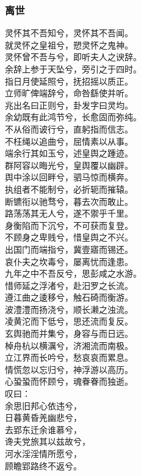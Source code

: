 \documentclass[]{article}
\begin{document}
\hypertarget{header-n326}{%
\subsubsection{离世}\label{header-n326}}

灵怀其不吾知兮，灵怀其不吾闻。\\
就灵怀之皇祖兮，愬灵怀之鬼神。\\
灵怀曾不吾与兮，即听夫人之谀辞。\\
余辞上参于天坠兮，旁引之于四时。\\
指日月使延照兮，抚招摇以质正。\\
立师旷俾端辞兮，命咎繇使并听。\\
兆出名曰正则兮，卦发字曰灵均。\\
余幼既有此鸿节兮，长愈固而弥纯。\\
不从俗而诐行兮，直躬指而信志。\\
不枉绳以追曲兮，屈情素以从事。\\
端余行其如玉兮，述皇舆之踵迹。\\
群阿容以晦光兮，皇舆覆以幽辟。\\
舆中涂以回畔兮，驷马惊而横奔。\\
执组者不能制兮，必折轭而摧辕。\\
断镳衔以驰骛兮，暮去次而敢止。\\
路荡荡其无人兮，遂不禦乎千里。\\
身衡陷而下沉兮，不可获而复登。\\
不顾身之卑贱兮，惜皇舆之不兴。\\
出国门而端指兮，冀壹寤而锡还。\\
哀仆夫之坎毒兮，屡离忧而逢患。\\
九年之中不吾反兮，思彭咸之水游。\\
惜师延之浮渚兮，赴汨罗之长流。\\
遵江曲之逶移兮，触石碕而衡游。\\
波澧澧而扬浇兮，顺长濑之浊流。\\
凌黄沱而下低兮，思还流而复反。\\
玄舆驰而并集兮，身容与而日远。\\
棹舟杭以横濿兮，济湘流而南极。\\
立江界而长吟兮，愁哀哀而累息。\\
情慌忽以忘归兮，神浮游以高历。\\
心蛩蛩而怀顾兮，魂眷眷而独逝。\\
叹曰：\\
余思旧邦心依违兮，\\
日暮黄昏羌幽悲兮，\\
去郢东迁余谁慕兮，\\
谗夫党旅其以兹故兮，\\
河水淫淫情所愿兮，\\
顾瞻郢路终不返兮。
\end{document}
